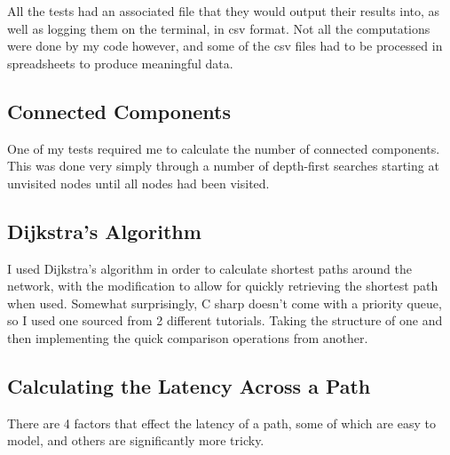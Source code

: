 \documentclass[12pt]{report}
\begin{document}
All the tests had an associated file that they would output their results into, as well as logging them on the terminal, in csv format. Not all the computations were done by my code however, and some of the csv files had to be processed in spreadsheets to produce meaningful data.

\subsection{Connected Components}
One of my tests required me to calculate the number of connected components. This was done very simply through a number of depth-first searches starting at unvisited nodes until all nodes had been visited.

\subsection{Dijkstra's Algorithm}

I used Dijkstra's algorithm in order to calculate shortest paths around the network, with the modification to allow for quickly retrieving the shortest path when used. Somewhat surprisingly, C sharp doesn't come with a priority queue, so I used one sourced from 2 different tutorials. Taking the structure of one and then implementing the quick comparison operations from another.\cite{PriorityQueue1}\cite{PriorityQueue2}

\subsection{Calculating the Latency Across a Path}

There are 4 factors that effect the latency of a path, some of which are easy to model, and others are significantly more tricky.
\end{document}
